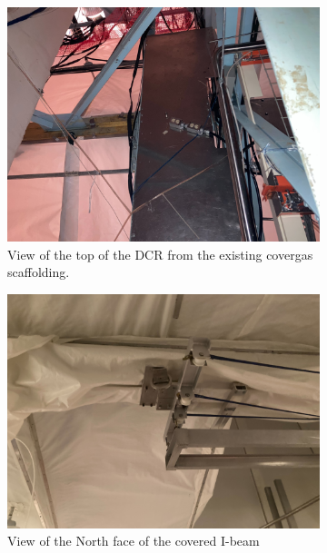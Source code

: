 \documentclass[11pt]{article}
\begin{document}
\begin{figure}[htbp]
\begin{center}
	\begin{subfigure}{0.45\textwidth}
	\includegraphics[width=\textwidth]{TopOfDCR}
	\caption{View of the top of the DCR from the existing covergas scaffolding.}
	\label{fig:topofDCR}
	\end{subfigure}
	\begin{subfigure}{0.45\textwidth}
	\includegraphics[width=\textwidth]{CoveredIbeamNorth}
	\caption{View of the North face of the covered I-beam}
	\label{fig:cvIbeamN}
	\end{subfigure}
	\begin{subfigure}{0.45\textwidth}

\end{subfigure}
\end{center}
\end{figure}
\end{document}
